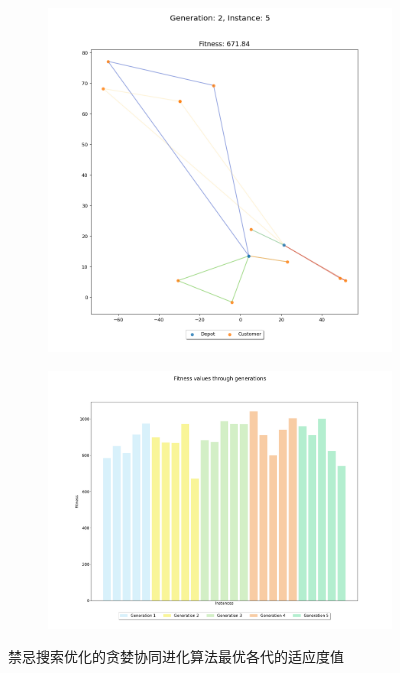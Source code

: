 \documentclass[12pt,a4paper,oneside]{ctexart}
\begin{document}
\vspace{-12pt} %

\begin{figure}[htbp]
	\centering
	\begin{subfigure}[b]{0.316\textwidth}
		\centering
		\includegraphics[width=\textwidth]{fig/9.png}
	\end{subfigure}
	\hspace{2pt} %
	\begin{subfigure}[b]{0.4\textwidth}
		\centering
		\includegraphics[width=\textwidth]{fig/10.png}
	\end{subfigure}
	\caption{禁忌搜索优化的贪婪协同进化算法最优各代的适应度值}
\end{figure}
\end{document}
